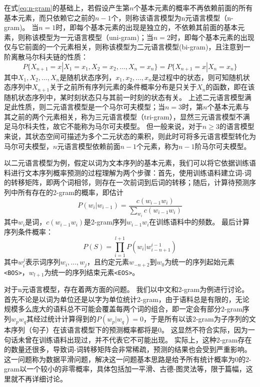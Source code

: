 在式\ref{eq:n-gram}的基础上，若假设产生第$n$个基本元素的概率不再依赖前面的所有基本元素，而只依赖它之前的$n-1$个，则称该语言模型为n元语言模型（n-gram)。
当$n=1$时，即每个基本元素的出现是独立的，不依赖其前面的基本元素，则称该模型为一元语言模型（uni-gram)；当$n=2$时，即每个基本元素的出现仅与它前面的一个元素相关，则称该模型为二元语言模型(bi-gram)，且注意到一阶离散马尔科夫链的性质：
\begin{equation}
    P\{X_{n+1} = x|X_1 = x_1, X_2 = x_2, \dots, X_n = x_n\} = P\{X_{n+1} = x| X_n = x_n\}
\end{equation}
其中$X_1, X_2, \dots , X_n$是随机状态序列，$x_1, x_2, \dots, x_n$是过程中的状态，则可知随机状态序列中$X_{n+1}$关于之前所有序列元素的条件概率分布是只关于${X_n}$的函数，即在该随机状态序列中，某时刻状态只与其前一时刻的状态有关。
上述二元语言模型满足此性质，则二元语言模型是一个马尔可夫模型；当$n=3$时，第$n$个基本元素与其之前的两个元素相关，称为三元语言模型（tri-gram），显然三元语言模型不满足马尔科夫性，故它不能称为马尔可夫模型。
但一般来说，对于$n\geq 3$的语言模型来说，其状态空间可描述为多个二元状态的乘积，则此时可将多元语言模型转化为马尔可夫模型，$n$元语言模型依赖前面$n-1$个元素，称为$n-1$阶马尔可夫模型。

以二元语言模型为例，假定以词为文本序列的基本元素，我们可以将它依据训练语料进行文本序列概率预测的过程理解为两个步骤：首先，使用训练语料建立词-词的转移矩阵，即两个词相邻，则存在一次前词到后词的转移；随后，计算待预测序列中所有存在的2-gram的概率，即估计
\begin{equation}
    P(w_i|w_{i-1}) = \frac{c(w_{i-1}w_i)}{\sum_{w_i}c(w_{i-1}w_i)}
\end{equation}
其中$w_i$是词，$c(w_{i-1}w_i)$是2-gram序列$w_{i-1}w_i$在训练语料中的频数。
最后计算序列条件概率：
\begin{equation}
    P(S) = \prod_{i=1}^{l+1}P(w_i|w^{i-1}_{i-n+1})
\end{equation}
其中$w^j_i$表示词序列$w_i,\dots,w_j$，且约定元素$w_{-n+2}$到$w_0$为统一的序列起始元素\verb|<BOS>|，$w_{l+1}$为统一的序列结束元素\verb|<EOS>|。

对于n元语言模型，存在着两方面的问题。
我们以中文和2-gram为例进行讨论。
首先不论是以词为单位还是以字为单位统计2-gram，由于语料总是有限的，无论规模多么庞大的语料总不可能会覆盖每两个词的组合，即一定会有部分2-gram序列$w_p w_q$其经过统计计算得到的$P(w_p|w_q)=0$，于是所有以该2-gram为子序列的文本序列（句子）在该语言模型下的预测概率都将是0。
这显然不符合实际，因为一句话未曾在训练语料出现过，并不代表它不可能出现。
实际上，这种2-gram存在的数量还很多，导致词-词转移矩阵会非常稀疏，预测的结果也会受到严重影响。
这一问题称为数据平滑问题，解决这一问题基本思路是给予所有统计概率为0的2-gram以一个较小的非零概率，具体包括加一平滑、古德-图灵法等，限于篇幅，这里就不再详细讨论。


